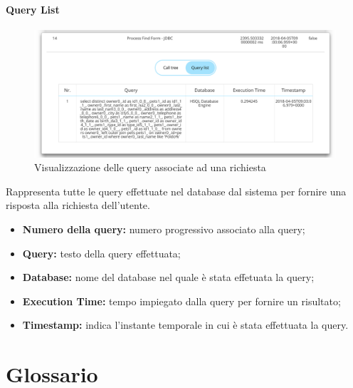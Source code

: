 \paragraph {Query List} \Spazio
\begin{figure}[H]
	\centering 
	\includegraphics[width=1\textwidth]{Images/querylist}
	\caption{Visualizzazione delle query associate ad una richiesta}
\end{figure}
Rappresenta tutte le query effettuate nel database dal sistema per fornire una risposta alla richiesta dell'utente.
    \begin{itemize}
	
	\item \textbf{Numero della query:} numero progressivo associato alla query;
	\item \textbf{Query:} testo della query effettuata;
	\item \textbf{Database:} nome del database nel quale è stata effetuata la query;
	\item \textbf{Execution Time:} tempo impiegato dalla query per fornire un risultato;
	\item \textbf{Timestamp:} indica l'instante temporale in cui è stata effettuata la query.
	
\end{itemize}



\newpage
\appendix
\section{Glossario}




